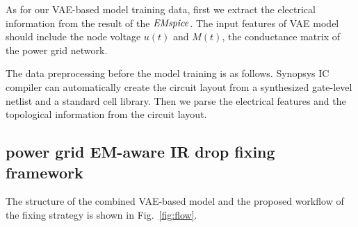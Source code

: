 As for our VAE-based model training data, first we extract the electrical information from the result of the  $\it{EMspice}$. The input features of VAE model should include the node voltage $u(t)$ and $M(t)$,  the conductance matrix of the power grid network.


The data preprocessing before the model training is as follows. Synopsys IC compiler can automatically create the circuit layout from a synthesized gate-level netlist and a standard cell library. 
Then we parse the electrical features and the topological information from the circuit layout.

\begin{table}[!htbp]
	\begin{center}
		\caption{Power Grid Design Detail}
		\label{table:pre_results}
		\center
	\end{center}
	\vspace{-0.1in}
\end{table}




\subsection{power grid EM-aware IR drop fixing framework }
\label{subsec:formulation}

The structure of the combined VAE-based model and the proposed workflow of the fixing strategy is shown in Fig.~\ref{fig:flow}. 


